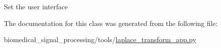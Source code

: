 \begin{DoxyVerb}Set the user interface
\end{DoxyVerb}
 

The documentation for this class was generated from the following file\+:\begin{DoxyCompactItemize}
\item 
biomedical\+\_\+signal\+\_\+processing/tools/\hyperlink{laplace__transform__app_8py}{laplace\+\_\+transform\+\_\+app.\+py}\end{DoxyCompactItemize}
